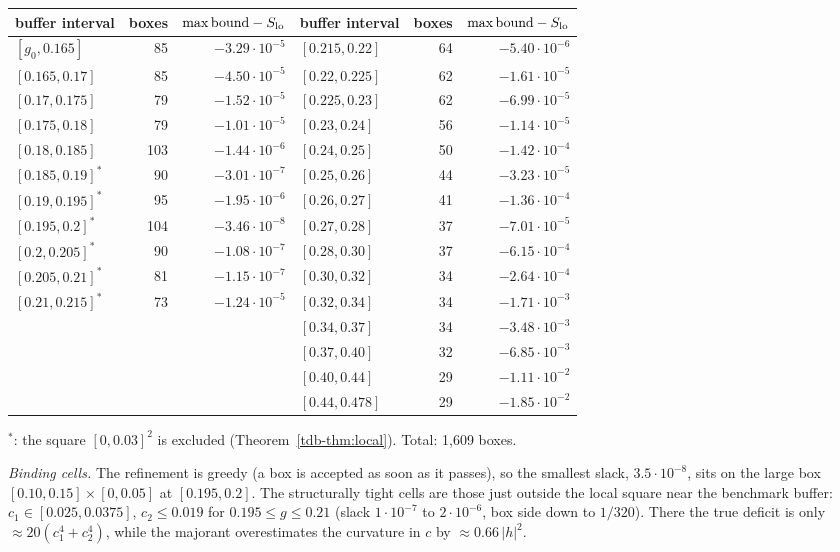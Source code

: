 \begin{center}\small
\begin{tabular}{lrr@{\qquad}lrr}\toprule
buffer interval & boxes & $\max\text{bound}-S_{\rm lo}$ & buffer interval & boxes & $\max\text{bound}-S_{\rm lo}$\\\midrule
$[g_0,0.165]$ & 85 & $-3.29\cdot10^{-5}$ & $[0.215,0.22]$ & 64 & $-5.40\cdot10^{-6}$\\
$[0.165,0.17]$ & 85 & $-4.50\cdot10^{-5}$ & $[0.22,0.225]$ & 62 & $-1.61\cdot10^{-5}$\\
$[0.17,0.175]$ & 79 & $-1.52\cdot10^{-5}$ & $[0.225,0.23]$ & 62 & $-6.99\cdot10^{-5}$\\
$[0.175,0.18]$ & 79 & $-1.01\cdot10^{-5}$ & $[0.23,0.24]$ & 56 & $-1.14\cdot10^{-5}$\\
$[0.18,0.185]$ & 103 & $-1.44\cdot10^{-6}$ & $[0.24,0.25]$ & 50 & $-1.42\cdot10^{-4}$\\
$[0.185,0.19]^\ast$ & 90 & $-3.01\cdot10^{-7}$ & $[0.25,0.26]$ & 44 & $-3.23\cdot10^{-5}$\\
$[0.19,0.195]^\ast$ & 95 & $-1.95\cdot10^{-6}$ & $[0.26,0.27]$ & 41 & $-1.36\cdot10^{-4}$\\
$[0.195,0.2]^\ast$ & 104 & $-3.46\cdot10^{-8}$ & $[0.27,0.28]$ & 37 & $-7.01\cdot10^{-5}$\\
$[0.2,0.205]^\ast$ & 90 & $-1.08\cdot10^{-7}$ & $[0.28,0.30]$ & 37 & $-6.15\cdot10^{-4}$\\
$[0.205,0.21]^\ast$ & 81 & $-1.15\cdot10^{-7}$ & $[0.30,0.32]$ & 34 & $-2.64\cdot10^{-4}$\\
$[0.21,0.215]^\ast$ & 73 & $-1.24\cdot10^{-5}$ & $[0.32,0.34]$ & 34 & $-1.71\cdot10^{-3}$\\
 & & & $[0.34,0.37]$ & 34 & $-3.48\cdot10^{-3}$\\
 & & & $[0.37,0.40]$ & 32 & $-6.85\cdot10^{-3}$\\
 & & & $[0.40,0.44]$ & 29 & $-1.11\cdot10^{-2}$\\
 & & & $[0.44,0.478]$ & 29 & $-1.85\cdot10^{-2}$\\\bottomrule
\end{tabular}

{\footnotesize $^\ast$: the square $[0,0.03]^2$ is excluded (Theorem~\ref{tdb-thm:local}). Total: 1{,}609 boxes.}
\end{center}

\emph{Binding cells.} The refinement is greedy (a box is accepted as soon as it passes), so the smallest slack, $3.5\cdot10^{-8}$, sits on
the large box $[0.10,0.15]\times[0,0.05]$ at $[0.195,0.2]$. The structurally tight cells are those just outside the local square near the
benchmark buffer: $c_1\in[0.025,0.0375]$, $c_2\le0.019$ for $0.195\le g\le0.21$ (slack $1\cdot10^{-7}$ to $2\cdot10^{-6}$, box side down to
$1/320$). There the true deficit is only $\approx20(c_1^4+c_2^4)$, while the majorant overestimates the curvature in $c$ by $\approx0.66\,|h|^2$.

